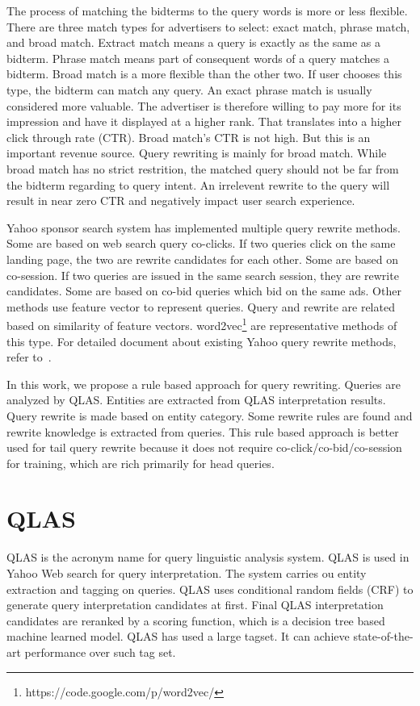 \documentclass{sig-alternate}
\begin{document}
The process of matching the bidterms to the query words is more or less flexible.    There are three match types for advertisers to select: exact match, phrase match, and broad match. Extract match means a query is exactly as the same as a bidterm. Phrase match means  part of consequent words of a query matches a bidterm. Broad match is a more flexible than the other two. If user chooses this type, the bidterm can match any query.  An exact phrase match is usually considered more valuable. The advertiser is therefore willing to pay more for its impression and have it displayed at a higher rank. That translates into a higher click through rate (CTR). Broad match's CTR is not high. But this is an important revenue source. Query rewriting is mainly for broad match. While broad match has no strict restrition,  the matched query should not be far from the bidterm regarding to query intent. An irrelevent rewrite to the query will result in near zero CTR and negatively impact user search experience.

Yahoo sponsor search system has implemented multiple query rewrite methods. Some are based on web search query co-clicks. If two queries click on the same landing page, the two are rewrite candidates for each other.   Some are based on co-session. If two queries are issued in the same search session, they are rewrite candidates. Some are  based on co-bid queries which bid on the same ads. Other methods use feature vector to represent queries. Query and rewrite are related based on similarity of feature vectors.  word2vec\footnote{https://code.google.com/p/word2vec/} are representative methods of  this type. For detailed document about existing Yahoo query rewrite methods, refer to~\cite{gurutalk2015}.

In this work, we propose a rule based approach for query rewriting. Queries are analyzed by QLAS. Entities are extracted from QLAS interpretation results. Query rewrite is made based on entity category. Some rewrite rules are found and rewrite  knowledge is extracted from queries. This rule based approach is better used for tail query rewrite because it does not require co-click/co-bid/co-session for training, which are rich  primarily for head queries. 



\section{QLAS}
\label{sec:qlas}
QLAS is the acronym name for query linguistic analysis system.  QLAS is used in Yahoo Web search for query interpretation. The system carries ou entity extraction and tagging on queries. QLAS uses conditional random fields (CRF) to generate query interpretation candidates at first. Final QLAS interpretation candidates are reranked by a scoring function, which is a decision tree based machine learned model. QLAS has used a large tagset. It can achieve state-of-the-art performance over such tag set. 
\end{document}
